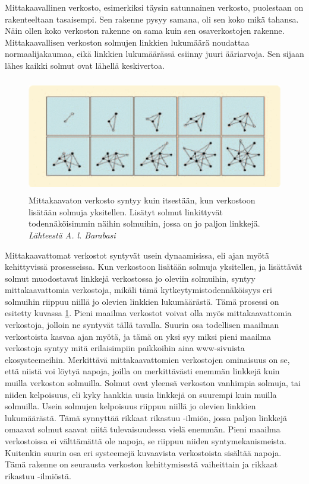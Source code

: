 \documentclass[finnish,12pt,a4paper,pdftex,elec,utf8]{aaltothesis}
\begin{document}
Mittakaavallinen verkosto, esimerkiksi täysin satunnainen verkosto, puolestaan on rakenteeltaan tasaisempi. Sen rakenne pysyy samana, oli sen koko mikä tahansa. Näin ollen koko verkoston rakenne on sama kuin sen osaverkostojen rakenne. Mittakaavallisen verkoston solmujen linkkien lukumäärä noudattaa normaalijakaumaa, eikä linkkien lukumäärässä esiinny juuri ääriarvoja. Sen sijaan lähes kaikki solmut ovat lähellä keskivertoa.


\begin{figure}[htb]
\centering \includegraphics[height=5cm]{Barabasi_2}
\caption{Mittakaavaton verkosto syntyy kuin itsestään, kun verkostoon lisätään solmuja yksitellen. Lisätyt solmut linkittyvät todennäköisimmin näihin solmuihin, jossa on jo paljon linkkejä. \textit{Lähteestä A. l. Barabasi \cite{The-Architecture}} \label{fig:Barabasi_2}}
\end{figure}

Mittakaavattomat verkostot syntyvät usein dynaamisissa, eli ajan myötä kehittyvissä prosesseissa. Kun verkostoon lisätään solmuja yksitellen, ja lisättävät solmut muodostavat linkkejä verkostossa jo oleviin solmuihin, syntyy mittakaavattomia verkostoja, mikäli tämä kytkeytymistodennäköisyys eri solmuihin riippuu niillä jo olevien linkkien lukumäärästä. Tämä prosessi on esitetty kuvassa \ref{fig:Barabasi_2}.  Pieni maailma verkostot voivat olla myös mittakaavattomia verkostoja, jolloin ne syntyvät tällä tavalla. Suurin osa todellisen maailman verkostoista kasvaa ajan myötä, ja tämä on yksi syy miksi pieni maailma verkostoja syntyy mitä erilaisimpiin paikkoihin aina www-sivuista ekosysteemeihin. Merkittävä mittakaavattomien verkostojen ominaisuus on se, että niistä voi löytyä napoja, joilla on merkittävästi enemmän linkkejä kuin muilla verkoston solmuilla. Solmut ovat yleensä verkoston vanhimpia solmuja, tai niiden kelpoisuus, eli kyky hankkia uusia linkkejä on suurempi kuin muilla solmuilla. Usein solmujen kelpoisuus riippuu niillä jo olevien linkkien lukumäärästä. Tämä synnyttää rikkaat rikastuu -ilmiön, jossa paljon linkkejä omaavat solmut saavat niitä tulevaisuudessa vielä enemmän. \cite[117]{Nexus} Pieni maailma verkostoissa ei välttämättä ole napoja, se riippuu niiden syntymekanismeista. Kuitenkin suurin osa eri systeemejä kuvaavista verkostoista sisältää napoja. Tämä rakenne on seurausta verkoston kehittymisestä vaiheittain ja rikkaat rikastuu -ilmiöstä. \cite[118]{Nexus}
\end{document}

